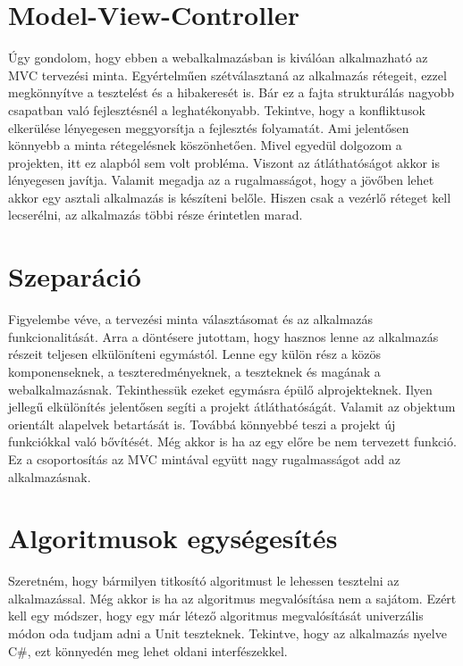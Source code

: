 \documentclass[12pt]{report} %
\begin{document}
\section{Model-View-Controller} %

Úgy gondolom, hogy ebben a webalkalmazásban is kiválóan alkalmazható az MVC \cite{mozillaMvc} tervezési minta. Egyértelműen szétválasztaná az alkalmazás rétegeit, ezzel megkönnyítve a tesztelést és a hibakeresét is. Bár ez a fajta strukturálás nagyobb csapatban való fejlesztésnél a leghatékonyabb. Tekintve, hogy a konfliktusok elkerülése lényegesen meggyorsítja a fejlesztés folyamatát. Ami jelentősen könnyebb a minta rétegelésnek köszönhetően. Mivel egyedül dolgozom a projekten, itt ez alapból sem volt probléma. Viszont az átláthatóságot akkor is lényegesen javítja. Valamit megadja az a rugalmasságot, hogy a jövőben lehet akkor egy asztali alkalmazás is készíteni belőle. Hiszen csak a vezérlő réteget kell lecserélni, az alkalmazás többi része érintetlen marad.

\section{Szeparáció} %

Figyelembe véve, a tervezési minta választásomat és az alkalmazás funkcionalitását. Arra a döntésere jutottam, hogy hasznos lenne az alkalmazás részeit teljesen elkülöníteni egymástól. Lenne egy külön rész a közös komponenseknek, a teszteredményeknek, a teszteknek és magának a webalkalmazásnak. Tekinthessük ezeket egymásra épülő alprojekteknek. Ilyen jellegű elkülönítés jelentősen segíti a projekt átláthatóságát. Valamit az objektum orientált alapelvek betartását is. Továbbá könnyebbé teszi a projekt új funkciókkal való bővítését. Még akkor is ha az egy előre be nem tervezett funkció. Ez a csoportosítás az MVC mintával együtt nagy rugalmasságot add az alkalmazásnak.

\section{Algoritmusok egységesítés} %

Szeretném, hogy bármilyen titkosító algoritmust le lehessen tesztelni az alkalmazással. Még akkor is ha az algoritmus megvalósítása nem a sajátom. Ezért kell egy módszer, hogy egy már létező algoritmus megvalósítását univerzális módon oda tudjam adni a Unit teszteknek. Tekintve, hogy az alkalmazás nyelve C\#, ezt könnyedén meg lehet oldani interfészekkel.
\end{document}
